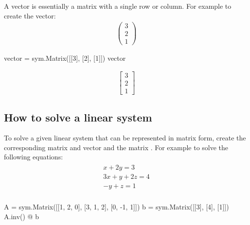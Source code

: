 A vector is essentially a matrix with a single row or column. For example to
create the vector:
\begin{equation*}
\begin{split}
    \begin{pmatrix}
    3 \\
    2 \\
    1
    \end{pmatrix}
\end{split}
\end{equation*}



\begin{pyin}
vector = sym.Matrix([[3], [2], [1]])
vector
\end{pyin}




\begin{equation*}
\begin{split}\displaystyle \left[\begin{matrix}3\\2\\1\end{matrix}\right]\end{split}
\end{equation*}




\subsection{How to solve a linear system}
\label{\detokenize{tools-for-mathematics/04-matrices/how/main:how-to-solve-a-linear-system}}

To solve a given linear system that can be represented in matrix form, create
the corresponding matrix and vector and the matrix . For example to
solve the following equations:
\begin{equation*}
\begin{split}
    \begin{array}{l}
        x + 2y = 3\\
        3x + y + 2z = 4\\
        - y + z = 1\\
    \end{array}
\end{split}
\end{equation*}



\begin{pyin}
A = sym.Matrix([[1, 2, 0], [3, 1, 2], [0, -1, 1]])
b = sym.Matrix([[3], [4], [1]])
A.inv() @ b
\end{pyin}





